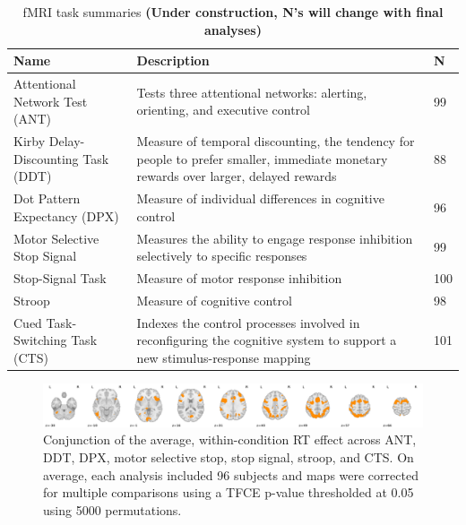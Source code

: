 \documentclass[titlepage,12pt] {article}
\begin{document}
\begin{table}[h!]
  \begin{center}
    \caption{fMRI task summaries \textbf{(Under construction, N's will change with final analyses)}}
    \label{tab:task_summaries}
    \begin{tabular}{|L{6cm}|L{7cm}|L{1cm}|}\hline
   \textbf{Name} & \textbf{Description} & \textbf{N} \\ \hline\hline
   Attentional Network Test (ANT) &  Tests three attentional networks: alerting, orienting, and executive control & 99 \\ \hline
   Kirby Delay-Discounting Task (DDT) & Measure of temporal discounting, the tendency for people to prefer smaller, immediate monetary rewards over larger, delayed rewards & 88 \\ \hline
   Dot Pattern Expectancy (DPX) & Measure of individual differences in cognitive control & 96 \\ \hline
   Motor Selective Stop Signal & Measures the ability to engage response inhibition selectively to specific responses & 99 \\ \hline
   Stop-Signal Task & Measure of motor response inhibition & 100 \\ \hline
   Stroop & Measure of cognitive control & 98 \\ \hline
   Cued Task-Switching Task (CTS) & Indexes the control processes involved in reconfiguring the cognitive system to support a new stimulus-response mapping & 101 \\ \hline
    \end{tabular}
   \end{center}
 \end{table}

\begin{figure}
  \centering
   \includegraphics[width=6.5in]{Figures/conjunction_avg_rt_effect_across_7tasks.pdf}
   \caption{Conjunction of the average, within-condition RT effect across ANT, DDT, DPX, motor selective stop, stop signal, stroop, and CTS.  On average, each analysis included 96 subjects and maps were corrected for multiple comparisons using a TFCE p-value thresholded at 0.05 using 5000 permutations.}
  \label{fig:conj}
\end{figure}
\end{document}

